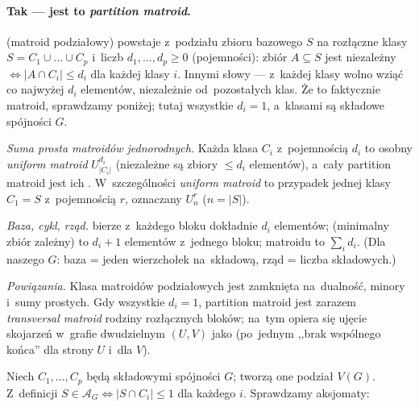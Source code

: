 \paragraph{Tak --- jest to \emph{partition matroid}.}
\begin{dygresja}
	 (matroid podziałowy) powstaje z~podziału zbioru bazowego $S$ na rozłączne
	klasy $S=C_1\cup\dots\cup C_p$ i~liczb $d_1,\dots,d_p\ge 0$ (pojemności): zbiór
	$A\subseteq S$ jest niezależny $\iff |A\cap C_i|\le d_i$ dla każdej klasy $i$.
	Innymi słowy --- z~każdej klasy wolno wziąć co najwyżej $d_i$ elementów,
	niezależnie od~pozostałych klas. Że to faktycznie matroid, sprawdzamy poniżej;
	tutaj wszystkie $d_i=1$, a~klasami są składowe spójności $G$.

	\emph{Suma prosta matroidów jednorodnych.} Każda klasa $C_i$ z~pojemnością
	$d_i$ to osobny \emph{uniform matroid} $U^{d_i}_{|C_i|}$ (niezależne są zbiory
	$\le d_i$ elementów), a~cały partition matroid jest ich .
	W~szczególności \emph{uniform matroid} to przypadek jednej klasy $C_1=S$
	z~pojemnością $r$, oznaczany $U^r_n$ ($n=|S|$).

	\emph{Baza, cykl, rząd.}  bierze z~każdego bloku dokładnie $d_i$
	elementów;  (minimalny zbiór zależny) to $d_i{+}1$ elementów
	z~jednego bloku;  matroidu to $\sum_i d_i$. (Dla naszego $G$:
	baza = jeden wierzchołek na~składową, rząd = liczba składowych.)

	\emph{Powiązania.} Klasa matroidów podziałowych jest zamknięta na~dualność,
	minory i~sumy prostych. Gdy wszystkie $d_i=1$, partition matroid jest zarazem
	\emph{transversal matroid} rodziny rozłącznych bloków; na~tym opiera się ujęcie
	skojarzeń w~grafie dwudzielnym $(U,V)$ jako 
	(po~jednym ,,brak wspólnego końca'' dla strony $U$ i~dla $V$).
\end{dygresja}
Niech $C_1,\dots,C_p$ będą składowymi spójności $G$; tworzą one podział
$V(G)$. Z~definicji $S\in\mathcal{A}_G\iff |S\cap C_i|\le 1$ dla każdego $i$.
Sprawdzamy aksjomaty:


